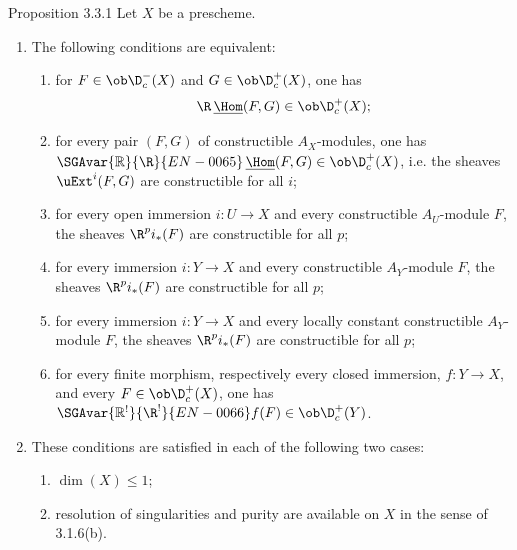\begin{statement}{Proposition 3.3.1}
Let $X$ be a prescheme.
\begin{enumerate}[label=\alph*)]
\item The following conditions are equivalent:
\begin{enumerate}[label=(\roman*)]
\item for $F\in\ob\D_c^-(X)$ and $G\in\ob\D_c^+(X)$, one has
\[
   \R\,\underline{\Hom}(F,G)\in\ob\D_c^+(X);
\]
\item[(i bis)] for every pair $(F,G)$ of constructible $A_X$-modules, one has $\SGAvar{\mathbb{R}}{\R}{EN-0065}\,\underline{\Hom}(F,G)\in\ob\D_c^+(X)$, i.e. the sheaves $\uExt^i(F,G)$ are constructible for all $i$;
\item for every open immersion $i:U\to X$ and every constructible $A_U$-module $F$, the sheaves $\R^pi_*(F)$ are constructible for all $p$;
\item[(ii bis)] for every immersion $i:Y\to X$ and every constructible $A_Y$-module $F$, the sheaves $\R^pi_*(F)$ are constructible for all $p$;
\item[(ii ter)] for every immersion $i:Y\to X$ and every locally constant constructible $A_Y$-module $F$, the sheaves $\R^pi_*(F)$ are constructible for all $p$;
\item for every finite morphism, respectively every closed immersion, $f:Y\to X$, and every $F\in\ob\D_c^+(X)$, one has $\SGAvar{\mathbb{R}^!}{\R^!}{EN-0066}f(F)\in\ob\D_c^+(Y)$.
\end{enumerate}
\item These conditions are satisfied in each of the following two cases:
\begin{enumerate}[label=(\roman*)]
\item $\dim(X)\le1$;
\item resolution of singularities and purity are available on $X$ in the sense of 3.1.6(b).
\end{enumerate}
\end{enumerate}
\end{statement}

